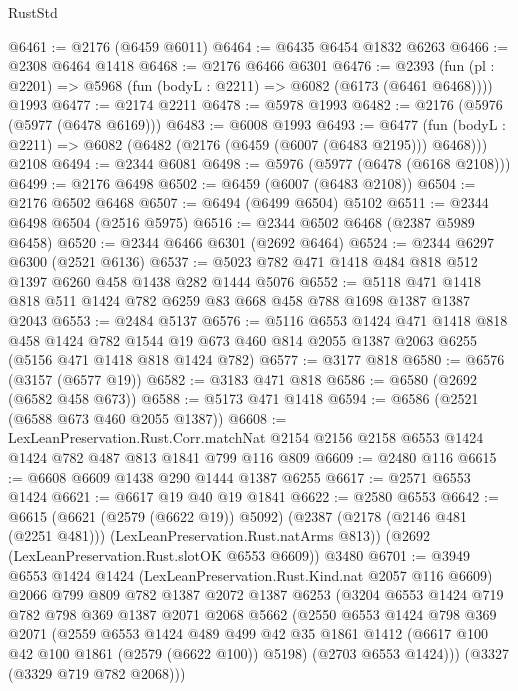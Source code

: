 \begin{lexlean}{RustStd}
\begin{coremodule}
@6461 := @2176 (@6459 @6011)
@6464 := @6435 @6454 @1832 @6263
@6466 := @2308 @6464 @1418
@6468 := @2176 @6466 @6301
@6476 := @2393
    (fun (pl : @2201) => @5968 (fun (bodyL : @2211) => @6082 (@6173 (@6461 @6468))))
    @1993
@6477 := @2174 @2211
@6478 := @5978 @1993
@6482 := @2176 (@5976 (@5977 (@6478 @6169)))
@6483 := @6008 @1993
@6493 := @6477
    (fun (bodyL : @2211) => @6082 (@6482 (@2176 (@6459 (@6007 (@6483 @2195))) @6468)))
    @2108
@6494 := @2344 @6081
@6498 := @5976 (@5977 (@6478 (@6168 @2108)))
@6499 := @2176 @6498
@6502 := @6459 (@6007 (@6483 @2108))
@6504 := @2176 @6502 @6468
@6507 := @6494 (@6499 @6504) @5102
@6511 := @2344 @6498 @6504 (@2516 @5975)
@6516 := @2344 @6502 @6468 (@2387 @5989 @6458)
@6520 := @2344 @6466 @6301 (@2692 @6464)
@6524 := @2344 @6297 @6300 (@2521 @6136)
@6537 := @5023 @782 @471 @1418 @484 @818 @512 @1397 @6260 @458 @1438 @282 @1444 @5076
@6552 := @5118 @471 @1418 @818 @511 @1424 @782 @6259 @83 @668 @458 @788 @1698 @1387 @1387 @2043
@6553 := @2484 @5137
@6576 := @5116
    @6553
    @1424
    @471
    @1418
    @818
    @458
    @1424
    @782
    @1544
    @19
    @673
    @460
    @814
    @2055
    @1387
    @2063
    @6255
    (@5156 @471 @1418 @818 @1424 @782)
@6577 := @3177 @818
@6580 := @6576 (@3157 (@6577 @19))
@6582 := @3183 @471 @818
@6586 := @6580 (@2692 (@6582 @458 @673))
@6588 := @5173 @471 @1418
@6594 := @6586 (@2521 (@6588 @673 @460 @2055 @1387))
@6608 := LexLeanPreservation.Rust.Corr.matchNat
    @2154
    @2156
    @2158
    @6553
    @1424
    @1424
    @782
    @487
    @813
    @1841
    @799
    @116
    @809
@6609 := @2480 @116
@6615 := @6608 @6609 @1438 @290 @1444 @1387 @6255
@6617 := @2571 @6553 @1424
@6621 := @6617 @19 @40 @19 @1841
@6622 := @2580 @6553
@6642 := @6615
    (@6621 (@2579 (@6622 @19)) @5092)
    (@2387 (@2178 (@2146 @481 (@2251 @481))) (LexLeanPreservation.Rust.natArms @813))
    (@2692 (LexLeanPreservation.Rust.slotOK @6553 @6609))
    @3480
@6701 := @3949
    @6553
    @1424
    @1424
    (LexLeanPreservation.Rust.Kind.nat @2057 @116 @6609)
    @2066
    @799
    @809
    @782
    @1387
    @2072
    @1387
    @6253
    (@3204
      @6553
      @1424
      @719
      @782
      @798
      @369
      @1387
      @2071
      @2068
      @5662
      (@2550
        @6553
        @1424
        @798
        @369
        @2071
        (@2559
          @6553
          @1424
          @489
          @499
          @42
          @35
          @1861
          @1412
          (@6617 @100 @42 @100 @1861 (@2579 (@6622 @100)) @5198)
          (@2703 @6553 @1424)))
      (@3327 (@3329 @719 @782 @2068)))

\end{coremodule}
\end{lexlean}
